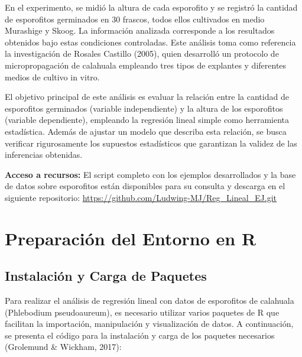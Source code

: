 \documentclass[
  spanish,
  a4paper,
  DIV=11,
  numbers=noendperiod,
  onepage,
  openany]{scrreprt}
\begin{document}
En el experimento, se midió la altura de cada esporofito y se registró
la cantidad de esporofitos germinados en 30 frascos, todos ellos
cultivados en medio Murashige y Skoog. La información analizada
corresponde a los resultados obtenidos bajo estas condiciones
controladas. Este análisis toma como referencia la investigación de
Rosales Castillo (2005), quien desarrolló un protocolo de
micropropagación de calahuala empleando tres tipos de explantes y
diferentes medios de cultivo in vitro.

El objetivo principal de este análisis es evaluar la relación entre la
cantidad de esporofitos germinados (variable independiente) y la altura
de los esporofitos (variable dependiente), empleando la regresión lineal
simple como herramienta estadística. Además de ajustar un modelo que
describa esta relación, se busca verificar rigurosamente los supuestos
estadísticos que garantizan la validez de las inferencias obtenidas.

\textbf{Acceso a recursos:} El script completo con los ejemplos
desarrollados y la base de datos sobre esporofitos están disponibles
para su consulta y descarga en el siguiente repositorio:
\url{https://github.com/Ludwing-MJ/Reg_Lineal_EJ.git}

\section{Preparación del Entorno en
R}\label{preparaciuxf3n-del-entorno-en-r}

\subsection{Instalación y Carga de
Paquetes}\label{instalaciuxf3n-y-carga-de-paquetes}

Para realizar el análisis de regresión lineal con datos de esporofitos
de calahuala (Phlebodium pseudoaureum), es necesario utilizar varios
paquetes de R que facilitan la importación, manipulación y visualización
de datos. A continuación, se presenta el código para la instalación y
carga de los paquetes necesarios (Grolemund \& Wickham, 2017):
\end{document}
